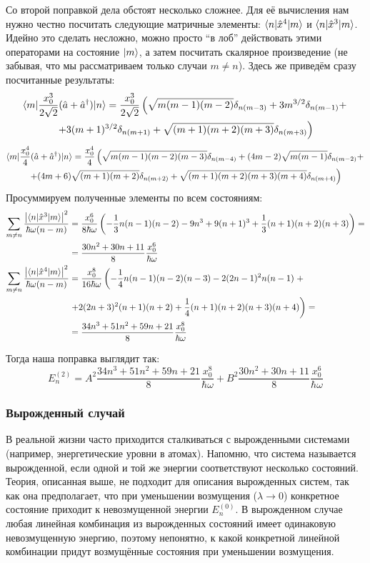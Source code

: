 Со второй поправкой дела обстоят несколько сложнее. Для её вычисления нам нужно
честно посчитать следующие матричные элементы: $\langle n\rvert\hat{x}^4\lvert m\rangle$ и
$\langle n\rvert\hat{x}^3\lvert m\rangle$. Идейно это сделать несложно, можно просто ``в лоб''
действовать этими операторами на состояние $\lvert m\rangle$, а затем посчитать
скалярное произведение (не забывая, что мы рассматриваем только случаи $m\neq
  n$). Здесь же приведём сразу посчитанные результаты:
\begin{multline*}
  \langle m\rvert\frac{x_0^3}{2\sqrt{2}}(\hat{a}+\hat{a}^{\dagger})\lvert n\rangle = \frac{x_0^3}{2\sqrt{2}}\left(\sqrt{m(m-1)(m-2)}\delta_{n(m-3)}+3m^{3/2}\delta_{n(m-1)}+\right. \\ \left.+ 3(m+1)^{3/2}\delta_{n(m+1)}+\sqrt{(m+1)(m+2)(m+3)}\delta_{n(m+3)}\right)
\end{multline*}
\begin{multline*}
  \langle m\rvert\frac{x_0^4}{4}(\hat{a}+\hat{a}^{\dagger})\lvert n\rangle = \frac{x_0^4}{4}\left(\sqrt{m(m-1)(m-2)(m-3)}\delta_{n(m-4)}+(4m-2)\sqrt{m(m-1)}\delta_{n(m-2)}+ \right.\\ \left.+(4m+6)\sqrt{(m+1)(m+2)}\delta_{n(m+2)}+\sqrt{(m+1)(m+2)(m+3)(m+4)}\delta_{n(m+4)}\right)
\end{multline*}
Просуммируем полученные элементы по всем состояниям:
\begin{align*}
  \sum\limits_{m\neq n}\frac{\left|\langle n\rvert\hat{x}^3\lvert m\rangle\right|^2}{\hbar\omega(n-m)} &= \frac{x_0^6}{8\hbar\omega}\left(-\frac{1}{3}n(n-1)(n-2)-9n^3+9(n+1)^3+\frac{1}{3}(n+1)(n+2)(n+3)\right)=\\
  &=\frac{30n^2+30n+11}{8}\frac{x_0^6}{\hbar\omega} \\
  \sum\limits_{m\neq n}\frac{\left|\langle n\rvert\hat{x}^4\lvert m\rangle\right|^2}{\hbar\omega(n-m)}&=\frac{x_0^8}{16\hbar\omega}\left(-\frac{1}{4}n(n-1)(n-2)(n-3)-2(2n-1)^2n(n-1)\right.+ \\
  &\left.+2(2n+3)^2(n+1)(n+2)+\frac{1}{4}(n+1)(n+2)(n+3)(n+4)\right) = \\
  &= \frac{34n^3+51n^2+59n+21}{8}\frac{x_0^8}{\hbar\omega}
\end{align*}

Тогда наша поправка выглядит так:
\[
  E_n^{(2)} = A^2\frac{34n^3+51n^2+59n+21}{8}\frac{x_0^8}{\hbar\omega}+B^2\frac{30n^2+30n+11}{8}\frac{x_0^6}{\hbar\omega}
\]
\qedsq

\subsubsection{Вырожденный случай}
В реальной жизни часто приходится сталкиваться с вырожденными системами
(например, энергетические уровни в атомах). Напомню, что система называется
вырожденной, если одной и той же энергии соответствуют несколько состояний.
Теория, описанная выше, не подходит для описания вырожденных систем, так как
она предполагает, что при уменьшении возмущения ($\lambda \rightarrow 0$)
конкретное состояние приходит к невозмущенной энергии $E^{(0)}_n$. В
вырожденном случае любая линейная комбинация из вырожденных состояний имеет
одинаковую невозмущенную энергию, поэтому непонятно, к какой конкретной
линейной комбинации придут возмущённые состояния при уменьшении возмущения.

